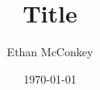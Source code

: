 \documentclass[12pt, a4paper]{article}
\title{Title}
\author{Ethan McConkey}
\date{\today}
\begin{document}
\thispagestyle{empty}
\begin{titlepage}
    \begin{center}
        \selectfont
        \fontsize{50pt}{65pt}\selectfont\thetitle
        \vfill
        \normalsize\theauthor\\[0.5cm]
        \normalsize\em\thedate
    \end{center}
\end{titlepage}
\tableofcontents
\doublespacing
\newpage



\newpage
\renewcommand\refname{References}
\nocite{*}


\end{document}
